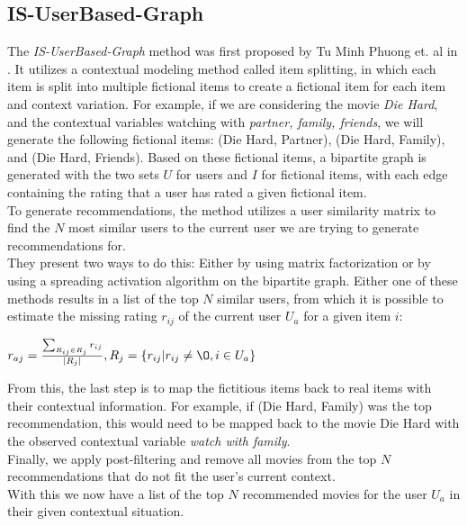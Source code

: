 \subsection{IS-UserBased-Graph}
The \textit{IS-UserBased-Graph} method was first proposed by Tu Minh Phuong et. al in \cite{GraphBasedCollaborativePaper}.
It utilizes a contextual modeling method called item splitting, in which each item is split into multiple fictional items to create a fictional item for each item and context variation.
For example, if we are considering the movie \textit{Die Hard}, and the contextual variables watching with \textit{partner, family, friends}, we will generate the following fictional items: (Die Hard, Partner), (Die Hard, Family), and (Die Hard, Friends).
Based on these fictional items, a bipartite graph is generated with the two sets $U$ for users and $I$ for fictional items, with each edge containing the rating that a user has rated a given fictional item.\\
To generate recommendations, the method utilizes a user similarity matrix to find the $N$ most similar users to the current user we are trying to generate recommendations for.\\
They present two ways to do this: Either by using matrix factorization or by using a spreading activation algorithm on the bipartite graph.
Either one of these methods results in a list of the top $N$ similar users, from which it is possible to estimate the missing rating $r_{ij}$ of the current user $U_a$ for a given item $i$:

$r_{aj} = \frac{\sum_{R_{ij} \in R_j} r_{ij}}{|R_j|}, R_j = \{ r_{ij} | r_{ij} \neq \O , i \in U_a \}$

From this, the last step is to map the fictitious items back to real items with their contextual information.
For example, if (Die Hard, Family) was the top recommendation, this would need to be mapped back to the movie Die Hard with the observed contextual variable \textit{watch with family}.\\
Finally, we apply post-filtering and remove all movies from the top $N$ recommendations that do not fit the user's current context.\\
With this we now have a list of the top $N$ recommended movies for the user $U_a$ in their given contextual situation.

